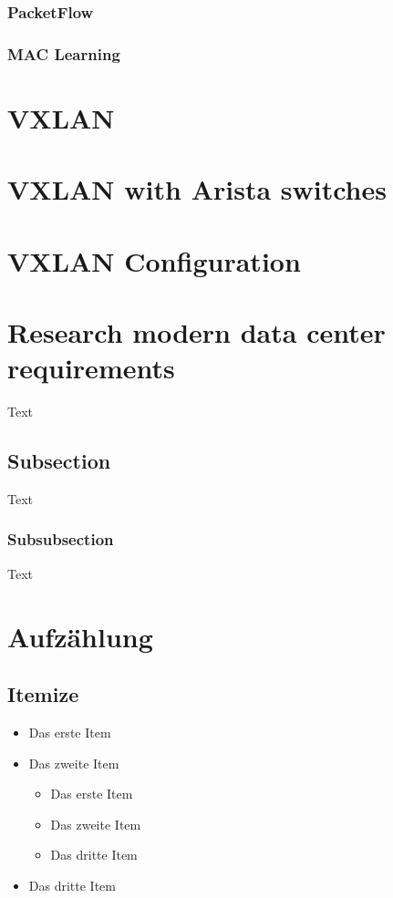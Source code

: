 \documentclass[a4,12pt]{scrartcl}
\begin{document}
\subsubsection{PacketFlow}
\subsubsection{MAC Learning}
\section{VXLAN}
\section{VXLAN with Arista switches}
\section{VXLAN Configuration}
\section{Research modern data center requirements}
Text


\subsection{Subsection}
Text


\subsubsection{Subsubsection}
Text

\section{Aufzählung}
\subsection{Itemize}
\begin{itemize}
\item Das erste Item
\item Das zweite Item
\begin{itemize}
\item Das erste Item
\item Das zweite Item
\item Das dritte Item
\end{itemize}
\item Das dritte Item
\end{itemize}
\end{document}
